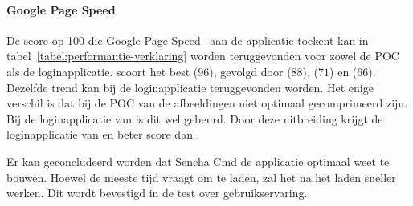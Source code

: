 \begin{table}[H]
\centering
{}
\caption{Metrieken gebruikt bij de verklaring van performantiecriterium voor \st{}~(\sta), \kendo{}~(\kendoa), \jqm{}~(\jqma) en \lungo{}~(\lungoa).}
\label{tabel:performantie-verklaring}
\end{table}

\paragraph{Google Page Speed}
De score op 100 die Google Page Speed~\cite{Morgan2011} aan de applicatie toekent kan in tabel~\ref{tabel:performantie-verklaring} worden teruggevonden voor zowel de POC als de loginapplicatie.
\st{} scoort het best ($96$),  gevolgd door \lungo{} ($88$),  \jqm{}($71$) en \kendo{}($66$).
Dezelfde trend kan bij de loginapplicatie teruggevonden worden.
Het enige verschil is dat bij de POC van \kendo{} de afbeeldingen niet optimaal gecomprimeerd zijn.
Bij de loginapplicatie van \kendo{} is dit wel gebeurd.
Door deze uitbreiding krijgt de loginapplicatie van \kendo{} en beter score dan \jqm{}.

Er kan geconcludeerd worden dat Sencha Cmd de applicatie optimaal weet te bouwen.
Hoewel \st{} de meeste tijd vraagt om te laden, zal het na het laden sneller werken.
Dit wordt bevestigd in de test over gebruikservaring.

